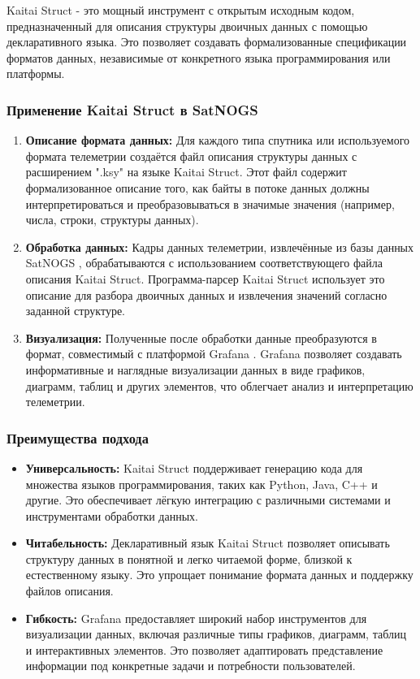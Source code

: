\documentclass[14pt, a4paper]{extreport}
\begin{document}
    Kaitai Struct - это мощный инструмент с открытым исходным кодом, предназначенный для описания структуры двоичных данных с помощью декларативного языка.
    Это позволяет создавать формализованные спецификации форматов данных,  независимые от конкретного языка программирования или платформы.

    \subsubsection{Применение Kaitai Struct в SatNOGS}

    \begin{enumerate}
        \item \textbf{Описание формата данных:} Для каждого типа спутника или используемого формата телеметрии создаётся файл описания структуры данных с расширением ".ksy" на языке Kaitai Struct.
        Этот файл содержит формализованное описание того, как байты в потоке данных должны интерпретироваться и преобразовываться в значимые значения (например, числа, строки, структуры данных).
        \item \textbf{Обработка данных:} Кадры данных телеметрии, извлечённые из базы данных SatNOGS \cite{satnogs_database_docs}, обрабатываются с использованием соответствующего файла описания Kaitai Struct.
        Программа-парсер Kaitai Struct использует это описание для разбора двоичных данных и извлечения значений согласно заданной структуре.
        \item \textbf{Визуализация:} Полученные после обработки данные преобразуются в формат, совместимый с платформой Grafana \cite{satnogs_grafana_docs}.
        Grafana позволяет создавать информативные и наглядные визуализации данных в виде графиков, диаграмм, таблиц и других элементов,  что облегчает анализ и интерпретацию телеметрии.
    \end{enumerate}

    \subsubsection{Преимущества подхода}

    \begin{itemize}[label={--}]
        \item \textbf{Универсальность:} Kaitai Struct поддерживает генерацию кода для множества языков программирования, таких как Python, Java, C++ и другие.
        Это обеспечивает лёгкую интеграцию с различными системами и инструментами обработки данных.
        \item \textbf{Читабельность:}  Декларативный язык Kaitai Struct позволяет описывать структуру данных в понятной и легко читаемой форме,  близкой к естественному языку.
        Это упрощает понимание формата данных и поддержку файлов описания.
        \item \textbf{Гибкость:} Grafana предоставляет широкий набор инструментов для визуализации данных, включая различные типы графиков, диаграмм, таблиц и интерактивных элементов.
        Это позволяет адаптировать представление информации под конкретные задачи и потребности пользователей.
    \end{itemize}
\end{document}

